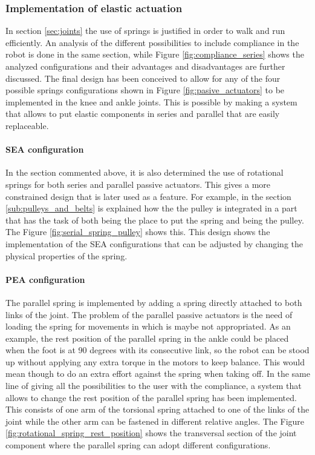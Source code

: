 
\subsubsection{Implementation of elastic actuation} %
\label{ssub:spring_integration}
In section \ref{sec:joints} the use of springs is justified in order to walk and run efficiently. 
An analysis of the different possibilities to include compliance in the robot is done in the same section, while Figure \ref{fig:compliance_series} shows the analyzed configurations and their advantages and disadvantages are further discussed.
The final design has been conceived to allow for any of the four possible springs configurations shown in Figure \ref{fig:pasive_actuators} to be implemented in the knee and ankle joints.
This is possible by making a system that allows to put elastic components in series and parallel that are easily replaceable.

\paragraph{SEA configuration} %
\label{para:sea_configuration}

In the section commented above, it is also determined the use of rotational springs for both series and parallel passive actuators.
This gives a more constrained design that is later used as a feature.
For example, in the section \ref{sub:pulleys_and_belts} is explained how the the pulley is integrated in a part that has the task of both being the place to put the spring and being the pulley.
The Figure \ref{fig:serial_spring_pulley} shows this.
This design shows the implementation of the SEA configurations that can be adjusted by changing the physical properties of the spring.

\paragraph{PEA configuration} %
\label{para:pea_configuration}

The parallel spring is implemented by adding a spring directly attached to both links of the joint.
The problem of the parallel passive actuators is the need of loading the spring for movements in which is maybe not appropriated.
As an example, the rest position of the parallel spring in the ankle could be placed when the foot is at 90 degrees with its consecutive link, so the robot can be stood up without applying any extra torque in the motors to keep balance.
This would mean though to do an extra effort against the spring when taking off.
In the same line of giving all the possibilities to the user with the compliance, a system that allows to change the rest position of the parallel spring has been implemented.
This consists of one arm of the torsional spring attached to one of the links of the joint while the other arm can be fastened in different relative angles.
The Figure \ref{fig:rotational_spring_rest_position} shows the transversal section of the joint component where the parallel spring can adopt different configurations. 

